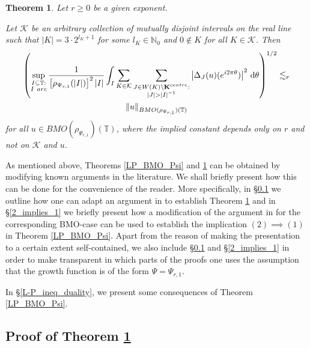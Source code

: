 \documentclass[a4paper, leqno, 10pt]{amsart}
\numberwithin{equation}{section}
\newtheorem{theo}[thm]{Theorem}
\newcommand{\dd}{\mathrm{d}}
\newcommand{\T}{\mathbb{T}}
\newcommand{\norm}[1]{\left\Vert#1\right\Vert}
\newcommand{\N}{\mathbb{N}}
\begin{document}
\begin{theo}\label{reverse_arbitrary} Let $r \geq 0$ be a given exponent.

Let $\mathcal{K}$ be an arbitrary collection of mutually disjoint intervals on the real line such that $|K| = 3 \cdot 2^{l_K+1}$ for some $l_K \in \N_0$ and $0 \notin K$ for all $K \in \mathcal{K}$. Then 
\begin{multline*}
\left( \sup_{\substack{I \subseteq \T: \\ I \ {\rm arc}}} \frac{1} { \left[ \rho_{\Psi_{r,1}} (|I|) \right]^2 |I|} \int_I \sum_{K \in \mathcal{K}}  \sum_{\substack{J \in W (K) \setminus \mathbf{K}^{\rm centre} : \\ |J| > |I|^{-1}}} \left| \Delta_J (u) (e^{i 2 \pi \theta}) \right|^2 \, \dd \theta \right)^{1/2} \lesssim_r  \\
\norm{ u }_{BMO (\rho_{\Psi_{r,1}}) (\T)}
\end{multline*}
for all $u \in BMO (\rho_{\Psi_{r,1}}) (\T)$, where the implied constant depends only on $r$ and not on $\mathcal{K}$ and $u$. 
\end{theo}

As mentioned above, Theorems \ref{LP_BMO_Psi} and \ref{reverse_arbitrary} can be obtained by modifying known arguments in the literature. We shall briefly present how this can be done for the convenience of the reader. %
More specifically, in \S \ref{rev_arb} we outline how one can adapt an argument in \cite{B_SF}  to establish Theorem \ref{reverse_arbitrary} and in \S \ref{2_implies_1} we briefly present how a modification of the argument in \cite{V-T} for the corresponding BMO-case can be used to establish the implication $(2) \implies (1)$ in Theorem \ref{LP_BMO_Psi}. Apart from the reason of making the presentation to a certain extent self-contained, we also include \S\ref{rev_arb} and \S \ref{2_implies_1} in order to make transparent in which parts of the proofs one uses the assumption that the growth function is of the form $\Psi = \Psi_{r,1}$.

In \S \ref{L-P_ineq_duality}, we present some consequences of Theorem \ref{LP_BMO_Psi}.

\subsection{Proof of Theorem \ref{reverse_arbitrary}}\label{rev_arb}
\end{document}
